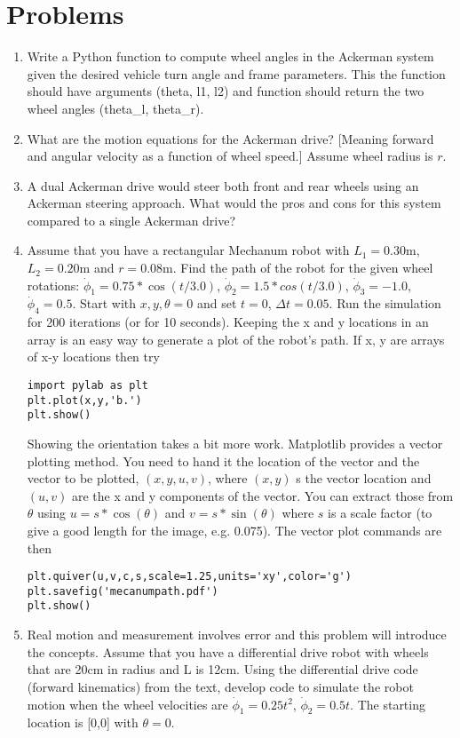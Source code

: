 \hypertarget{problems}{%
\section{Problems}\label{problems}}

\begin{enumerate}
\item
  Write a Python function to compute wheel angles in the Ackerman system
  given the desired vehicle turn angle and frame parameters. This the
  function should have arguments {(theta, l1, l2)} and function should
  return the two wheel angles {(theta\_l, theta\_r)}.
\item
  What are the motion equations for the Ackerman drive? {[}Meaning
  forward and angular velocity as a function of wheel speed.{]} Assume
  wheel radius is \(r\).
\item
  A dual Ackerman drive would steer both front and rear wheels using an
  Ackerman steering approach. What would the pros and cons for this
  system compared to a single Ackerman drive?
\item
  Assume that you have a rectangular Mechanum robot with
  \(L_1 = 0.30\)m, \(L_2 = 0.20\)m and \(r=0.08\)m. Find the path of the
  robot for the given wheel rotations:
  \(\dot{\phi}_1 = 0.75*\cos(t/3.0)\),
  \(\dot{\phi}_2 = 1.5*cos(t/3.0)\), \(\dot{\phi}_3 = -1.0\),
  \(\dot{\phi}_4 = 0.5\). Start with \(x, y, \theta = 0\) and set
  \(t=0\), \(\Delta t = 0.05\). Run the simulation for 200 iterations
  (or for 10 seconds). Keeping the x and y locations in an array is an
  easy way to generate a plot of the robot's path. If x, y are arrays of
  x-y locations then try

\begin{verbatim}
import pylab as plt
plt.plot(x,y,'b.')
plt.show()
\end{verbatim}

  Showing the orientation takes a bit more work. Matplotlib provides a
  vector plotting method. You need to hand it the location of the vector
  and the vector to be plotted, \((x,y,u,v)\), where \((x,y)\) s the
  vector location and \((u,v)\) are the x and y components of the
  vector. You can extract those from \(\theta\) using
  \(u = s*\cos(\theta)\) and \(v = s*\sin(\theta)\) where \(s\) is a
  scale factor (to give a good length for the image, e.g. 0.075). The
  vector plot commands are then

\begin{verbatim}
plt.quiver(u,v,c,s,scale=1.25,units='xy',color='g')
plt.savefig('mecanumpath.pdf')
plt.show()
\end{verbatim}
\item
  Real motion and measurement involves error and this problem will
  introduce the concepts. Assume that you have a differential drive
  robot with wheels that are 20cm in radius and L is 12cm. Using the
  differential drive code (forward kinematics) from the text, develop
  code to simulate the robot motion when the wheel velocities are
  \(\dot{\phi}_1 = 0.25t^2\), \(\dot{\phi}_2 = 0.5t\). The starting
  location is {[}0,0{]} with \(\theta = 0\).


\end{enumerate}
